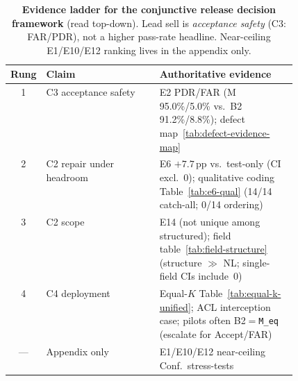 \begin{table}[t]
  \centering
  \caption{\textbf{Evidence ladder for the conjunctive release decision
    framework} (read top-down).
    Lead sell is \emph{acceptance safety} (C3: FAR/PDR), not a higher
    pass-rate headline.
    Near-ceiling E1/E10/E12 ranking lives in the appendix only.}
  \label{tab:evidence-ladder}
  \footnotesize
  \renewcommand{\arraystretch}{1.12}
  \begin{tabular}{@{}clp{0.48\linewidth}@{}}
    \toprule
    Rung & Claim & Authoritative evidence \\
    \midrule
    1 & C3 acceptance safety
      & E2 PDR/FAR (M 95.0\%/5.0\% vs.\ B2 91.2\%/8.8\%); defect
        map~\ref{tab:defect-evidence-map} \\
    2 & C2 repair under headroom
      & E6 ${+}7.7$\,pp vs.\ test-only (CI excl.~0);
        qualitative coding Table~\ref{tab:e6-qual}
        (14/14 catch-all; 0/14 ordering) \\
    3 & C2 scope
      & E14 (not unique among structured); field table~\ref{tab:field-structure}
        (structure $\gg$ NL; single-field CIs include~0) \\
    4 & C4 deployment
      & Equal-$K$ Table~\ref{tab:equal-k-unified}; ACL interception case;
        pilots often B2${=}$\texttt{M\_eq} (escalate for Accept/FAR) \\
    --- & Appendix only
      & E1/E10/E12 near-ceiling Conf.\ stress-tests \\
    \bottomrule
  \end{tabular}
\end{table}
